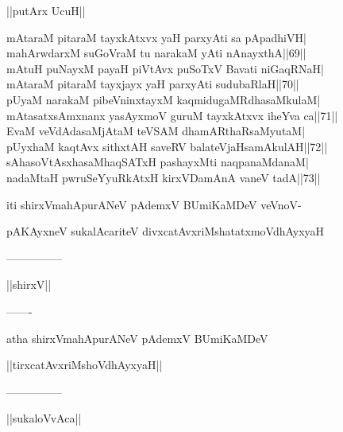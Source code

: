 \documentclass{article}
\begin{document}
\begin{center}
||putArx UcuH||
\end{center}

mAtaraM pitaraM tayxkAtxvx yaH parxyAti sa pApadhiVH|\\
mahArwdarxM suGoVraM tu narakaM yAti nAnayxthA||69||\\
mAtuH puNayxM payaH piVtAvx puSoTxV Bavati niGaqRNaH|\\
mAtaraM pitaraM tayxjayx yaH parxyAti sudubaRlaH||70||\\
pUyaM narakaM pibeVninxtayxM kaqmidugaMRdhasaMkulaM|\\
mAtasatxsAmxnanx yasAyxmoV guruM tayxkAtxvx iheYva ca||71||\\
EvaM veVdAdasaMjAtaM teVSAM dhamARthaRsaMyutaM|\\
pUyxhaM kaqtAvx sithxtAH saveRV balateVjaHsamAkulAH||72||\\
sAhasoVtAsxhasaMhaqSATxH pashayxMti naqpanaMdanaM|\\
nadaMtaH pwruSeYyuRkAtxH kirxVDamAnA vaneV tadA||73||

\begin{center}
iti shirxVmahApurANeV pAdemxV BUmiKaMDeV veVnoV-
\end{center}

\begin{center}
pAKAyxneV sukalAcariteV divxcatAvxriMshatatxmoVdhAyxyaH
\end{center}

\begin{center}
---------------
\end{center}

\begin{center}
||shirxV||
\end{center}

\begin{center}
-------
\end{center}

\begin{center}
atha shirxVmahApurANeV pAdemxV BUmiKaMDeV
\end{center}

\begin{center}
||tirxcatAvxriMshoVdhAyxyaH||
\end{center}

\begin{center}
---------------
\end{center}

\begin{center}
||sukaloVvAca||
\end{center}
\end{document}
